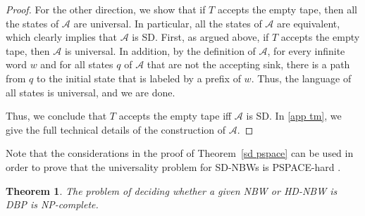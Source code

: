 \documentclass[10pt,a4paper]{amsart}
\newtheorem{thm}{Theorem}[section]
\theoremstyle{definition}
\numberwithin{equation}{section}
\newcommand{\A}{{\mathcal A}}
\begin{document}
\begin{proof}
For the other direction, we show that if $T$ accepts the empty tape, then all the states of $\A$ are universal. In particular, all the states of $\A$ are equivalent, which clearly implies that $\A$ is SD. First, as argued above, if $T$ accepts the empty tape, then $\A$ is universal. In addition, by the definition of $\A$, for every infinite word $w$ and for all states $q$ of $\A$ that are not the accepting sink, there is a path from $q$ to the initial state that is labeled by a prefix of $w$. Thus, the language of all states is universal, and we are done.


Thus, we conclude that $T$ accepts the empty tape iff $\A$ is SD.
In \autoref{app tm}, we give the full technical details of the construction of $\A$.
\end{proof}

Note that the considerations in the proof of Theorem~\ref{sd pspace} can be used in order to prove that the universality problem for SD-NBWs is PSPACE-hard \cite{AK23}.


 \begin{thm}\label{NPC Buchi DBP}
	The problem of deciding whether a given NBW or HD-NBW is DBP is NP-complete.
\end{thm}
\end{document}
